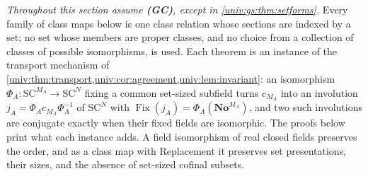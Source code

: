 \documentclass[11pt,letterpaper]{article}
\numberwithin{equation}{section}
\theoremstyle{definition}
\theoremstyle{remark}
\newcommand{\No}{\mathbf{No}}
\newcommand{\SC}{\mathrm{SC}}
\newcommand{\SCN}{\SC^{N}}
\newcommand{\Fix}{\operatorname{Fix}}
\begin{document}
\emph{Throughout this section assume \textbf{(GC)}, except in \cref{univ:gs:thm:setforms}.}
Every family of class maps below is one class relation whose sections are indexed by a set;
no set whose members are proper classes, and no choice from a collection of classes of
possible isomorphisms, is used. Each theorem is an instance of the transport mechanism of
\cref{univ:thm:transport,univ:cor:agreement,univ:lem:invariant}: an isomorphism
$\Phi_A:\SC^{M_A}\to\SCN$ fixing a common set-sized subfield turns $c_{M_A}$ into an involution
$j_A=\Phi_Ac_{M_A}\Phi_A^{-1}$ of $\SCN$ with $\Fix(j_A)=\Phi_A(\No^{M_A})$, and two such
involutions are conjugate exactly when their fixed fields are isomorphic. The proofs below print
what each instance adds. A field isomorphism of real closed fields preserves the order, and as a
class map with Replacement it preserves set presentations, their sizes, and the absence of
set-sized cofinal subsets.
\end{document}
